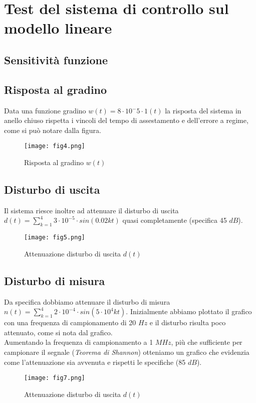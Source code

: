 \documentclass{article}
\begin{document}
\section{Test del sistema di controllo sul modello lineare}
\subsection{Sensitività funzione}

\subsection{Risposta al gradino}
Data una funzione gradino $w(t)=8\cdot10{^-5}\cdot1(t)$ la risposta del sistema in anello chiuso rispetta i vincoli del tempo di assestamento e dell'errore a regime, come si può notare dalla figura.
\begin{figure}[!h]
\centering
\texttt{[image: fig4.png]}
\caption{\label{fig:orbit}Risposta al gradino $w(t)$}
\end{figure}

\subsection{Disturbo di uscita}
Il sistema riesce inoltre ad attenuare il disturbo di uscita $d(t)=\sum_{k=1}^4 3\cdot10^{-5}\cdot sin(0.02kt)$ quasi completamente (specifica 45 $dB$).
\begin{figure}[!h]
\centering
\texttt{[image: fig5.png]}
\caption{\label{fig:orbit}Attenuazione disturbo di uscita $d(t)$}
\end{figure}

\subsection{Disturbo di misura}
Da specifica dobbiamo attenuare il disturbo di misura $n(t)=\sum_{k=1}^4 2\cdot10^{-4}\cdot sin(5\cdot 10^4kt)$. Inizialmente abbiamo plottato il grafico con una frequenza di campionamento di 20 $Hz$ e il disturbo risulta poco attenuato, come si nota dal grafico.
\\
Aumentando la frequenza di campionamento a 1 $MHz$, più che sufficiente per campionare il segnale 
(\textit{Teorema di Shannon}) otteniamo un grafico che evidenzia come l'attenuazione sia avvenuta e rispetti le specifiche (85 $dB$).
\begin{figure}[!h]
\centering
\texttt{[image: fig7.png]}
\caption{\label{fig:orbit}Attenuazione disturbo di uscita $d(t)$}
\end{figure}
\end{document}
